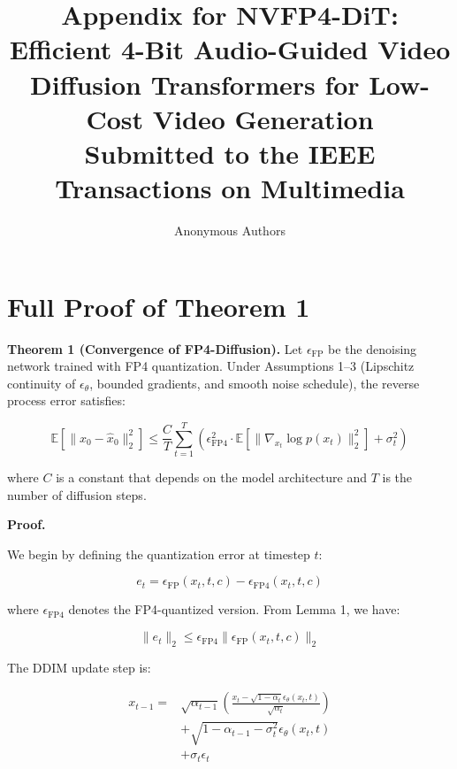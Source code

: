 \documentclass[journal,twoside]{IEEEtran}
\theoremstyle{definition}
\theoremstyle{remark}
\newcommand{\EE}{\mathbb{E}}
\begin{document}
\title{Appendix for NVFP4-DiT: Efficient 4-Bit Audio-Guided Video Diffusion Transformers for Low-Cost Video Generation \\ {\small Submitted to the IEEE Transactions on Multimedia}}

\author{Anonymous Authors}

\maketitle

\appendices

\section{Full Proof of Theorem 1}
\label{app:a}

\textbf{Theorem 1 (Convergence of FP4-Diffusion).}
Let $\epsilon_{\text{FP}}$ be the denoising network trained with FP4 quantization. Under Assumptions 1--3 (Lipschitz continuity of $\epsilon_\theta$, bounded gradients, and smooth noise schedule), the reverse process error satisfies:

\[
\EE[\|x_0 - \hat{x}_0\|_2^2] \leq \frac{C}{T} \sum_{t=1}^T \left( \epsilon_{\text{FP4}}^2 \cdot \EE[\|\nabla_{x_t} \log p(x_t)\|_2^2] + \sigma_t^2 \right)
\]

where $C$ is a constant that depends on the model architecture and $T$ is the number of diffusion steps.

\textbf{Proof.}

We begin by defining the quantization error at timestep $t$:

\[
e_t = \epsilon_{\text{FP}}(x_t, t, c) - \epsilon_{\text{FP4}}(x_t, t, c)
\]

where $\epsilon_{\text{FP4}}$ denotes the FP4-quantized version. From Lemma 1, we have:

\[
\|e_t\|_2 \leq \epsilon_{\text{FP4}} \|\epsilon_{\text{FP}}(x_t, t, c)\|_2
\]

The DDIM update step is:

\begin{equation}
\begin{split}
x_{t-1} = &\sqrt{\alpha_{t-1}} \left( \frac{x_t - \sqrt{1-\alpha_t} \epsilon_\theta(x_t, t)}{\sqrt{\alpha_t}} \right) \\
&+ \sqrt{1-\alpha_{t-1} - \sigma_t^2} \epsilon_\theta(x_t, t) \\
&+ \sigma_t \epsilon_t
\end{split}
\end{equation}
\end{document}
